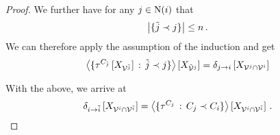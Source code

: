 \begin{proof}
	We further have for any $j\in\mathrm{N}(i)$ that
	\begin{align*}
		\left|\{\tilde{j}\prec j\}\right| \leq n \, .
	\end{align*}
	We can therefore apply the assumption of the induction and get
	\begin{align*}
 		\left\langle \{\tau^{C_{\tilde{j}}}\left[X_{\mathcal{V}^{\tilde{j}}}\right] \, : \, \tilde{j}\prec j\}
			\right\rangle \left[ X_{\tilde{\mathcal{V}}^{j}} \right]
		= \delta_{j \rightarrow i}\left[X_{\mathcal{V}^{j}\cap\mathcal{V}^{i}}\right]
	\end{align*}

	With the above, we arrive at 
	\begin{align*}
		\delta_{i \rightarrow \tilde{i}}\left[X_{\mathcal{V}^{i}\cap\mathcal{V}^{\tilde{i}}}\right]
		= \left\langle \{\tau^{C_{j}}\,:\,C_{j}\prec C_{i}\}\right\rangle \left[ X_{\mathcal{V}^{i}\cap\mathcal{V}^{\tilde{i}}} \right]   \, .
	\end{align*}
\end{proof}


